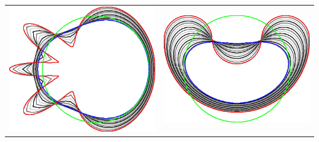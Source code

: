 \begin{frame}
\begin{center}
\begin{tabular}{cc}
\includegraphics[scale=0.12]{figures/graphcut/no-neighborhood-flow-always-improve/0.0020661157/flower.png}\hspace{3em} &
\includegraphics[scale=0.12]{figures/graphcut/no-neighborhood-flow-always-improve/0.0020661157/bean.png}
\end{tabular}

\end{center}




\end{frame}

